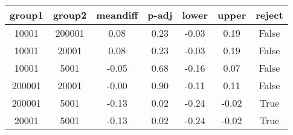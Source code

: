 \begin{tabular}{|c|c|c|c|c|c|c|}
\toprule
 group1 &  group2 &  meandiff &  p-adj &  lower &  upper &  reject \\
\midrule
  10001 &  200001 &      0.08 &   0.23 &  -0.03 &   0.19 &   False \\
  10001 &   20001 &      0.08 &   0.23 &  -0.03 &   0.19 &   False \\
  10001 &    5001 &     -0.05 &   0.68 &  -0.16 &   0.07 &   False \\
 200001 &   20001 &     -0.00 &   0.90 &  -0.11 &   0.11 &   False \\
 200001 &    5001 &     -0.13 &   0.02 &  -0.24 &  -0.02 &    True \\
  20001 &    5001 &     -0.13 &   0.02 &  -0.24 &  -0.02 &    True \\
\bottomrule
\end{tabular}
